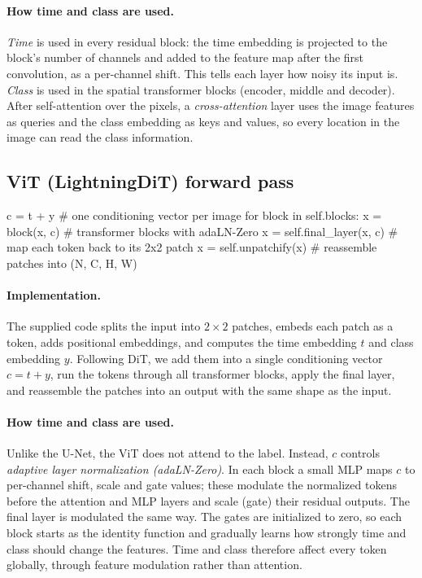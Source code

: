 \documentclass[11pt]{article}
\begin{document}
\paragraph{How time and class are used.} \emph{Time} is used in every residual block: the time
embedding is projected to the block's number of channels and added to the feature map after the first
convolution, as a per-channel shift. This tells each layer how noisy its input is. \emph{Class} is
used in the spatial transformer blocks (encoder, middle and decoder). After self-attention over the
pixels, a \emph{cross-attention} layer uses the image features as queries and the class embedding as
keys and values, so every location in the image can read the class information.

\subsection{ViT (LightningDiT) forward pass}
\begin{codeblock}
c = t + y                      # one conditioning vector per image
for block in self.blocks:
    x = block(x, c)            # transformer blocks with adaLN-Zero
x = self.final_layer(x, c)     # map each token back to its 2x2 patch
x = self.unpatchify(x)         # reassemble patches into (N, C, H, W)
\end{codeblock}
\paragraph{Implementation.} The supplied code splits the input into $2\times2$ patches, embeds each patch
as a token, adds positional embeddings, and computes the time embedding $t$ and class embedding $y$.
Following DiT, we add them into a single conditioning vector $c=t+y$, run the tokens through all
transformer blocks, apply the final layer, and reassemble the patches into an output with the same
shape as the input.

\paragraph{How time and class are used.} Unlike the U-Net, the ViT does not attend to the label. Instead,
$c$ controls \emph{adaptive layer normalization (adaLN-Zero)}. In each block a small MLP maps $c$ to
per-channel shift, scale and gate values; these modulate the normalized tokens before the attention
and MLP layers and scale (gate) their residual outputs. The final layer is modulated the same way.
The gates are initialized to zero, so each block starts as the identity function and gradually learns
how strongly time and class should change the features. Time and class therefore affect every token
globally, through feature modulation rather than attention.
\end{document}
